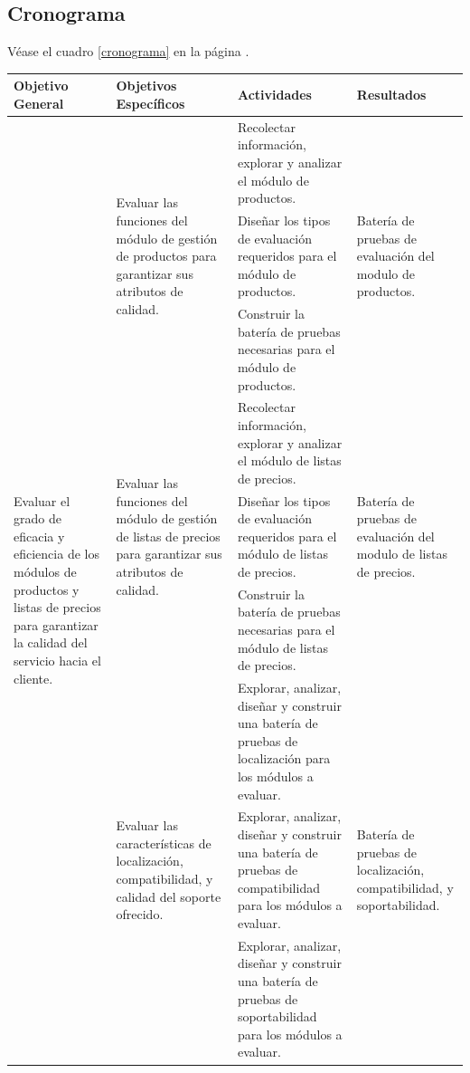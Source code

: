 \subsection{Cronograma}
Véase el cuadro \ref{cronograma} en la página \pageref{cronograma}.

\begin{table}
\centering
\small
\begin{tabular}{|l|l|p{6.5cm}|l|}
\hline
Objetivo General & Objetivos Específicos & Actividades & Resultados \\
\hline
\multirow{15}{4.0cm}{Evaluar el grado de eficacia y eficiencia de los módulos de productos y listas de precios para garantizar la calidad del servicio hacia el cliente.} &
\multirow{3}{4.0cm}{Evaluar las funciones del módulo de gestión de productos para garantizar sus atributos de calidad.} &
Recolectar información, explorar y analizar el módulo de productos. &
\multirow{3}{4.0cm}{Batería de pruebas de evaluación del modulo de productos.} \\
\cline{3-3}
& & Diseñar los tipos de evaluación requeridos para el módulo de productos. & \\
\cline{3-3}
& & Construir la batería de pruebas necesarias para el módulo de productos. & \\
\cline{2-4}
& \multirow{3}{4.0cm}{Evaluar las funciones del módulo de gestión de listas de precios para garantizar sus atributos de calidad.} &
Recolectar información, explorar y analizar el módulo de listas de precios. &
\multirow{3}{4.0cm}{Batería de pruebas de evaluación del modulo de listas de precios.} \\
\cline{3-3}
& & Diseñar los tipos de evaluación requeridos para el módulo de listas de precios. & \\
\cline{3-3}
& & Construir la batería de pruebas necesarias para el módulo de listas de precios. & \\
\cline{2-4}
& \multirow{3}{4.0cm}{Evaluar las características de localización, compatibilidad, y calidad del soporte ofrecido.} &
Explorar, analizar, diseñar y construir una batería de pruebas de localización para los módulos a evaluar. &
\multirow{3}{4.0cm}{Batería de pruebas de localización, compatibilidad, y soportabilidad.} \\
\cline{3-3}
& & Explorar, analizar, diseñar y construir una batería de pruebas de compatibilidad para los módulos a evaluar. & \\
\cline{3-3}
& & Explorar, analizar, diseñar y construir una batería de pruebas de soportabilidad para los módulos a evaluar. & \\

\end{tabular}
\end{table}
